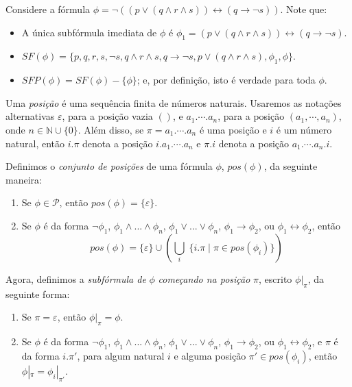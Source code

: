 \begin{example}
	Considere a fórmula $\phi = \neg((p \vee (q \wedge r \wedge s)) \leftrightarrow (q \rightarrow \neg s))$. Note que:
	\begin{itemize}
		\item A única subfórmula imediata de $\phi$ é $\phi_1 = (p \vee (q \wedge r \wedge s)) \leftrightarrow (q \rightarrow \neg s)$.
		\item $SF(\phi) = \{p,q,r,s,\neg s,q \wedge r \wedge s,q \rightarrow \neg s,p \vee (q \wedge r \wedge s),\phi_1,\phi \}$.
		\item $SFP(\phi) = SF(\phi) - \{\phi \}$; e, por definição, isto é verdade para toda $\phi$.
	\end{itemize}
\end{example}

\begin{definition}
	Uma \emph{posição} é uma sequência finita de números naturais. Usaremos as notações alternativas $\varepsilon$, para a posição vazia $()$, e $a_1.\cdots.a_n$, para a posição $(a_1,\cdots,a_n)$, onde $n \in \mathbb{N} \cup \{0\}$. Além disso, se $\pi = a_1.\cdots.a_n$ é uma posição e $i$ é um número natural, então $i.\pi$ denota a posição $i.a_1.\cdots.a_n$ e $\pi.i$ denota a posição $a_1.\cdots.a_n.i$.
	
    Definimos o \emph{conjunto de posições} de uma fórmula $\phi$, $pos(\phi)$, da seguinte maneira:
    \begin{enumerate}
        \item Se $\phi \in \mathcal{P}$, então $pos(\phi) = \{\varepsilon\}$.
        \item Se $\phi$ é da forma $\neg \phi_1$, $\phi_1 \wedge ... \wedge \phi_n$, $\phi_1 \vee ... \vee \phi_n$, $\phi_1 \rightarrow \phi_2$, ou $\phi_1 \leftrightarrow \phi_2$, então $$pos(\phi) = \{\varepsilon\} \cup \left(\bigcup_i \; \{i.\pi \mid \pi \in pos(\phi_i)\}\right)$$
    \end{enumerate}
    
    Agora, definimos a \emph{subfórmula de} $\phi$ \emph{começando na posição} $\pi$, escrito $\phi|_\pi$, da seguinte forma:
    \begin{enumerate}
        \item Se $\pi = \varepsilon$, então $\phi|_\pi = \phi$.
        \item Se $\phi$ é da forma $\neg \phi_1$, $\phi_1 \wedge ... \wedge \phi_n$, $\phi_1 \vee ... \vee \phi_n$, $\phi_1 \rightarrow \phi_2$, ou $\phi_1 \leftrightarrow \phi_2$, e $\pi$ é da forma $i.\pi'$, para algum natural $i$ e alguma posição $\pi' \in pos(\phi_i)$, então $\phi|_\pi = \phi_i|_{\pi'}$.
    \end{enumerate}
\end{definition}

